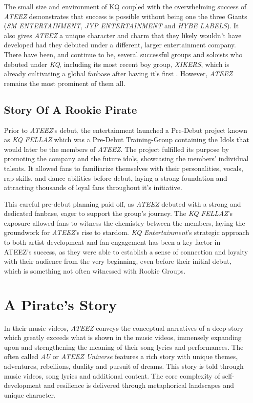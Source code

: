 \documentclass[a4paper,12pt]{article}
\begin{document}
The small size and environment of KQ coupled with the overwhelming success of \textit{ATEEZ} demonstrates that success is possible without being one the three Giants (\textit{SM ENTERTAINMENT}, \textit{JYP ENTERTAINMENT} and \textit{HYBE LABELS}). It also gives \textit{ATEEZ} a unique character and charm that they likely wouldn't have developed had they debuted under a different, larger entertainment company. There have been, and continue to be, several successful groups and soloists who debuted under \textit{KQ}, including its most recent boy group, \textit{XIKERS}, which is already cultivating a global fanbase after having it's first . However, \textit{ATEEZ} remains the most prominent of them all.

\subsection{Story Of A Rookie Pirate}
Prior to \textit{ATEEZ}'s debut, the entertainment launched a Pre-Debut project known as \textit{KQ FELLAZ} which was a Pre-Debut Training-Group containing the Idols that would later be the members of \textit{ATEEZ}. The project fulfilled its purpose by promoting the company and the future idols, showcasing the members' individual talents. It allowed fans to familiarize themselves with their personalities, vocals, rap skills, and dance abilities before debut, laying a strong foundation and attracting thousands of loyal fans throughout it's initiative.

This careful pre-debut planning paid off, as \textit{ATEEZ} debuted with a strong and dedicated fanbase, eager to support the group’s journey. The \textit{KQ FELLAZ}'s exposure allowed fans to witness the chemistry between the members, laying the groundwork for \textit{ATEEZ}'s rise to stardom. \textit{KQ Entertainment}’s strategic approach to both artist development and fan engagement has been a key factor in ATEEZ’s success, as they were able to establish a sense of connection and loyalty with their audience from the very beginning, even before their initial debut, which is something not often witnessed with Rookie Groups.


\section{A Pirate's Story}\label{sec:backstory}
In their music videos, \textit{ATEEZ} conveys the conceptual narratives of a deep story which greatly exceeds what is shown in the music videos, immensely expanding upon and strengthening the meaning of their song lyrics and performances. The often called \textit{AU} or \textit{ATEEZ Universe} features a rich story with unique themes, adventures, rebellions, duality and pursuit of dreams. This story is told through music videos, song lyrics and additional content. The core complexity of self-development and resilience is delivered through metaphorical landscapes and unique character.
\end{document}
